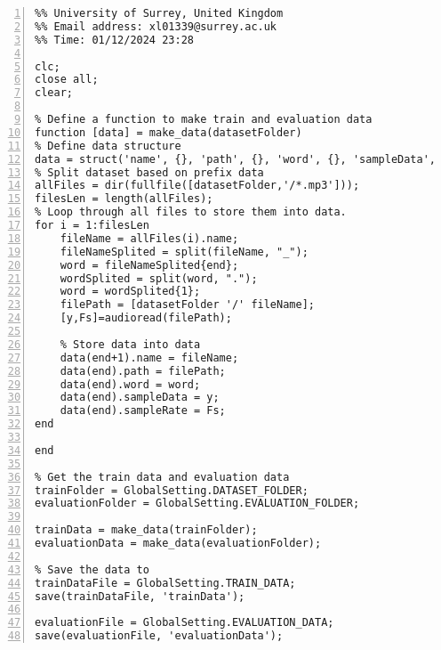 \documentclass{article}
\begin{document}
\begin{lstlisting}[frame=single, numbers=left, style=Matlab-editor, caption={make\_train\_evaluation\_data.m}, label={lst:train_model}]
  %% Author: Xiaoguang Liang (PG/T - Comp Sci & Elec Eng)
%% University of Surrey, United Kingdom
%% Email address: xl01339@surrey.ac.uk
%% Time: 01/12/2024 23:28

clc;
close all;
clear;

% Define a function to make train and evaluation data
function [data] = make_data(datasetFolder)
% Define data structure
data = struct('name', {}, 'path', {}, 'word', {}, 'sampleData', {}, 'sampleRate', {}');
% Split dataset based on prefix data
allFiles = dir(fullfile([datasetFolder,'/*.mp3']));
filesLen = length(allFiles);
% Loop through all files to store them into data.
for i = 1:filesLen
    fileName = allFiles(i).name;
    fileNameSplited = split(fileName, "_");
    word = fileNameSplited{end};
    wordSplited = split(word, ".");
    word = wordSplited{1};
    filePath = [datasetFolder '/' fileName];
    [y,Fs]=audioread(filePath);

    % Store data into data
    data(end+1).name = fileName;
    data(end).path = filePath;
    data(end).word = word;
    data(end).sampleData = y;
    data(end).sampleRate = Fs;
end

end

% Get the train data and evaluation data
trainFolder = GlobalSetting.DATASET_FOLDER;
evaluationFolder = GlobalSetting.EVALUATION_FOLDER;

trainData = make_data(trainFolder);
evaluationData = make_data(evaluationFolder);

% Save the data to
trainDataFile = GlobalSetting.TRAIN_DATA;
save(trainDataFile, 'trainData');

evaluationFile = GlobalSetting.EVALUATION_DATA;
save(evaluationFile, 'evaluationData');

\end{lstlisting}
\end{document}

